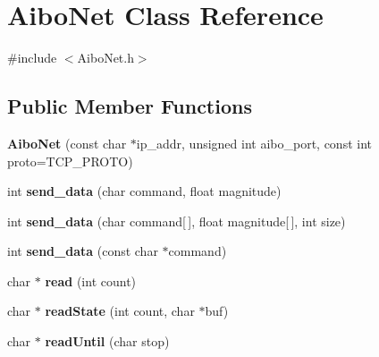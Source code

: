 \hypertarget{classAiboNet}{
\section{AiboNet Class Reference}
\label{classAiboNet}
}


{\ttfamily \#include $<$AiboNet.h$>$}

\subsection*{Public Member Functions}
\begin{DoxyCompactItemize}
\item 
\hypertarget{classAiboNet_aa631dcf3126a326ad5736d269f017fbc}{
{\bfseries AiboNet} (const char $\ast$ip\_\-addr, unsigned int aibo\_\-port, const int proto=TCP\_\-PROTO)}
\label{classAiboNet_aa631dcf3126a326ad5736d269f017fbc}

\item 
\hypertarget{classAiboNet_abec9a724fac2faba709b4b7ffff98b20}{
int {\bfseries send\_\-data} (char command, float magnitude)}
\label{classAiboNet_abec9a724fac2faba709b4b7ffff98b20}

\item 
\hypertarget{classAiboNet_aabeeda24d755f9963eabe94fe5be8168}{
int {\bfseries send\_\-data} (char command\mbox{[}$\,$\mbox{]}, float magnitude\mbox{[}$\,$\mbox{]}, int size)}
\label{classAiboNet_aabeeda24d755f9963eabe94fe5be8168}

\item 
\hypertarget{classAiboNet_a1cf0ae8e162473c3a08087c1420afeb4}{
int {\bfseries send\_\-data} (const char $\ast$command)}
\label{classAiboNet_a1cf0ae8e162473c3a08087c1420afeb4}

\item 
\hypertarget{classAiboNet_aaafd2d9a66c4e5483452af2ffe0bb13b}{
char $\ast$ {\bfseries read} (int count)}
\label{classAiboNet_aaafd2d9a66c4e5483452af2ffe0bb13b}

\item 
\hypertarget{classAiboNet_a9e5426adfa21849e6a5a60e8ccc20c5b}{
char $\ast$ {\bfseries readState} (int count, char $\ast$buf)}
\label{classAiboNet_a9e5426adfa21849e6a5a60e8ccc20c5b}

\item 
\hypertarget{classAiboNet_ae00d09ceee6bece904ff24fcf7f8a180}{
char $\ast$ {\bfseries readUntil} (char stop)}
\label{classAiboNet_ae00d09ceee6bece904ff24fcf7f8a180}

\end{DoxyCompactItemize}


